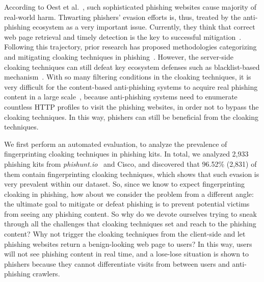 According to Oest et al.~\cite{oest2020sunrise}, such sophisticated phishing websites cause majority of real-world harm.
Thwarting phishers' evasion efforts is, thus, treated by the anti-phishing ecosystem as a very important issue.
Currently, they think that correct web page retrieval and timely detection is the key to successful mitigation~\cite{oest2020sunrise, zhang2021crawlphish}.
Following this trajectory, prior research has proposed methodologies categorizing and mitigating cloaking techniques in phishing~\cite{oest2018inside, oest2019phishfarm, zhang2021crawlphish}.
However, the server-side cloaking techniques can still defeat key ecosystem defenses such as blacklist-based mechanism~\cite{oest2019phishfarm}.
With so many filtering conditions in the cloaking techniques,
it is very difficult for the content-based anti-phishing systems to acquire real phishing content in a large scale~\cite{oest2018inside, oest2020phishtime},
because anti-phishing systems need to enumerate countless HTTP profiles to visit the phishing websites, in order not to bypass the cloaking techniques.
In this way, phishers can still be beneficial from the cloaking techniques.


We first perform an automated evaluation, to analyze the prevalence of fingerprinting cloaking techniques in phishing kits.
In total, we analyzed 2,933 phishing kits from \emph{phishunt.io}~\cite{phishunt} and Cisco, and discovered that 96.52\% (2,831) of them contain fingerprinting cloaking techniques, which shows that such evasion is very prevalent within our dataset.
So, since we know to expect fingerprinting cloaking in phishing, how about we consider the problem from a different angle:
the ultimate goal to mitigate or defeat phishing is to prevent potential victims from seeing any phishing content.
So why do we devote ourselves trying to sneak through all the challenges that cloaking techniques set and reach to the phishing content?
Why not trigger the cloaking techniques from the client-side and let phishing websites return a benign-looking web page to users?
In this way, users will not see phishing content in real time, and a lose-lose situation is shown to phishers because they cannot differentiate visits from between users and anti-phishing crawlers.

